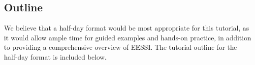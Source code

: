 \subsection*{Outline}

We believe that a half-day format would be most appropriate for this tutorial, as it would allow ample time for guided
examples and hands-on practice, in addition to providing a comprehensive overview of EESSI. The tutorial outline for the half-day format is included below.

% 

